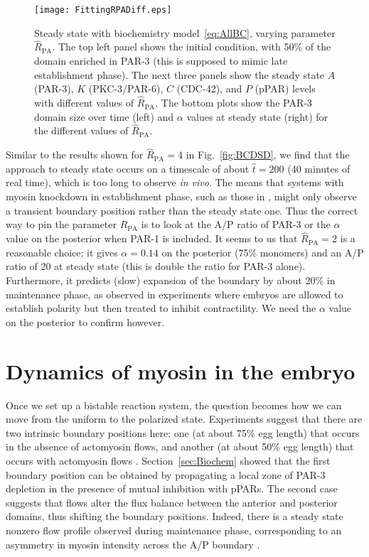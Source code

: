 \documentclass[11pt]{article}
\newcommand{\red}[1]{\color{red}#1\normalcolor}
\newcommand{\6}[1]{#1_{\text{6}}}
\newcommand{\3}[1]{#1_{\text{3}}}
\begin{document}
\begin{figure}
\centering
\texttt{[image: FittingRPADiff.eps]}
\caption{\label{fig:BCSS}Steady state with biochemistry model\ \eqref{eq:AllBC}, varying parameter $\hat R_\text{PA}$. The top left panel shows the initial condition, with 50\% of the domain enriched in PAR-3 (this is supposed to mimic late establishment phase). The next three panels show the steady state $A$ (PAR-3), $K$ (PKC-3/PAR-6), $C$ (CDC-42), and $P$ (pPAR) levels with different values of $\hat R_\text{PA}$. The bottom plots show the PAR-3 domain size over time (left) and $\alpha$ values at steady state (right) for the different values of $\hat R_\text{PA}$. }
\end{figure}

Similar to the results shown for $\hat R_\text{PA}=4$ in Fig.\ \ref{fig:BCDSD}, we find that the approach to steady state occurs on a timescale of about $\hat t = 200$ (40 minutes of real time), which is too long to observe \emph{in vivo}. The means that systems with myosin knockdown in establishment phase, such as those in \cite{zonies2010symmetry}, might only observe a transient boundary position rather than the steady state one. Thus the correct way to pin the parameter $\hat R_\text{PA}$ is to look at the A/P ratio of PAR-3 or the $\alpha$ value on the posterior when PAR-1 is included. It seems to us that $\hat R_\text{PA}=2$ is a reasonable choice; it gives $\alpha=0.14$ on the posterior (75\% monomers) and an A/P ratio of 20 at steady state (this is double the ratio for PAR-3 alone). Furthermore, it predicts (slow) expansion of the boundary by about 20\% in maintenance phase, as observed in experiments where embryos are allowed to establish polarity but then treated to inhibit contractility. \red{We need the $\alpha$ value on the posterior to confirm however.}

\newpage
\section{Dynamics of myosin in the embryo \label{sec:myosin}}
Once we set up a bistable reaction system, the question becomes how we can move from the uniform to the polarized state. Experiments suggest that there are two intrinsic boundary positions here: one (at about 75\% egg length) that occurs in the absence of actomyosin flows, and another (at about 50\% egg length) that occurs with actomyosin flows \cite{zonies2010symmetry}. Section\ \ref{sec:Biochem} showed that the first boundary position can be obtained by propagating a local zone of PAR-3 depletion in the presence of mutual inhibition with pPARs. The second case suggests that flows alter the flux balance between the anterior and posterior domains, thus shifting the boundary positions. Indeed, there is a steady state nonzero flow profile observed during maintenance phase, corresponding to an asymmetry in myosin intensity across the A/P boundary \cite{sailer2015dynamic}.
\end{document}
